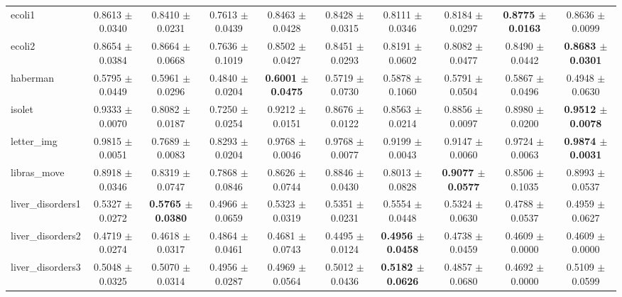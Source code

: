 \begin{table*}[htbp]
{\begin{tabular}{lccccccccc}
            ecoli1 & 0.8613 $\pm$ 0.0340 & 0.8410 $\pm$ 0.0231 & 0.7613 $\pm$ 0.0439 & 0.8463 $\pm$ 0.0428 & 0.8428 $\pm$ 0.0315 & 0.8111 $\pm$ 0.0346 & 0.8184 $\pm$ 0.0297 & \cellcolor{graybg}\textbf{0.8775 $\pm$ 0.0163} & 0.8636 $\pm$ 0.0099 \\ 
            ecoli2 & 0.8654 $\pm$ 0.0384 & 0.8664 $\pm$ 0.0668 & 0.7636 $\pm$ 0.1019 & 0.8502 $\pm$ 0.0427 & 0.8451 $\pm$ 0.0293 & 0.8191 $\pm$ 0.0602 & 0.8082 $\pm$ 0.0477 & 0.8490 $\pm$ 0.0442 & \cellcolor{graybg}\textbf{0.8683 $\pm$ 0.0301} \\ 
            haberman & 0.5795 $\pm$ 0.0449 & 0.5961 $\pm$ 0.0296 & 0.4840 $\pm$ 0.0204 & \cellcolor{graybg}\textbf{0.6001 $\pm$ 0.0475} & 0.5719 $\pm$ 0.0730 & 0.5878 $\pm$ 0.1060 & 0.5791 $\pm$ 0.0504 & 0.5867 $\pm$ 0.0496 & 0.4948 $\pm$ 0.0630 \\ 
            isolet & 0.9333 $\pm$ 0.0070 & 0.8082 $\pm$ 0.0187 & 0.7250 $\pm$ 0.0254 & 0.9212 $\pm$ 0.0151 & 0.8676 $\pm$ 0.0122 & 0.8563 $\pm$ 0.0214 & 0.8856 $\pm$ 0.0097 & 0.8980 $\pm$ 0.0200 & \cellcolor{graybg}\textbf{0.9512 $\pm$ 0.0078} \\ 
            letter\_img & 0.9815 $\pm$ 0.0051 & 0.7689 $\pm$ 0.0083 & 0.8293 $\pm$ 0.0204 & 0.9768 $\pm$ 0.0046 & 0.9768 $\pm$ 0.0077 & 0.9199 $\pm$ 0.0043 & 0.9147 $\pm$ 0.0060 & 0.9724 $\pm$ 0.0063 & \cellcolor{graybg}\textbf{0.9874 $\pm$ 0.0031} \\ 
            libras\_move & 0.8918 $\pm$ 0.0346 & 0.8319 $\pm$ 0.0747 & 0.7868 $\pm$ 0.0846 & 0.8626 $\pm$ 0.0744 & 0.8846 $\pm$ 0.0430 & 0.8013 $\pm$ 0.0828 & \cellcolor{graybg}\textbf{0.9077 $\pm$ 0.0577} & 0.8506 $\pm$ 0.1035 & 0.8993 $\pm$ 0.0537 \\ 
            liver\_disorders1 & 0.5327 $\pm$ 0.0272 & \cellcolor{graybg}\textbf{0.5765 $\pm$ 0.0380} & 0.4966 $\pm$ 0.0659 & 0.5323 $\pm$ 0.0319 & 0.5351 $\pm$ 0.0231 & 0.5554 $\pm$ 0.0448 & 0.5324 $\pm$ 0.0630 & 0.4788 $\pm$ 0.0537 & 0.4959 $\pm$ 0.0627 \\ 
            liver\_disorders2 & 0.4719 $\pm$ 0.0274 & 0.4618 $\pm$ 0.0317 & 0.4864 $\pm$ 0.0461 & 0.4681 $\pm$ 0.0743 & 0.4495 $\pm$ 0.0124 & \cellcolor{graybg}\textbf{0.4956 $\pm$ 0.0458} & 0.4738 $\pm$ 0.0459 & 0.4609 $\pm$ 0.0000 & 0.4609 $\pm$ 0.0000 \\ 
            liver\_disorders3 & 0.5048 $\pm$ 0.0325 & 0.5070 $\pm$ 0.0314 & 0.4956 $\pm$ 0.0287 & 0.4969 $\pm$ 0.0564 & 0.5012 $\pm$ 0.0436 & \cellcolor{graybg}\textbf{0.5182 $\pm$ 0.0626} & 0.4857 $\pm$ 0.0680 & 0.4692 $\pm$ 0.0000 & 0.5109 $\pm$ 0.0599 \\ 

\end{tabular}}
\end{table*}
